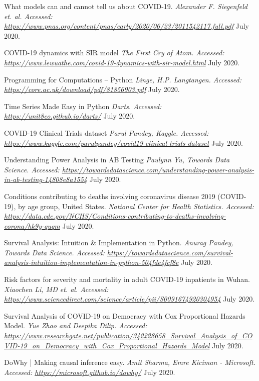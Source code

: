 \begin{thebibliography}{1}
 What models can and cannot tell us about COVID-19. {\em Alexander F. Siegenfeld et. al. Accessed:  \url{https://www.pnas.org/content/pnas/early/2020/06/23/2011542117.full.pdf}} July 2020.

 COVID-19 dynamics with SIR model {\em The First Cry of Atom. Accessed:  \url{https://www.lewuathe.com/covid-19-dynamics-with-sir-model.html}} July 2020.

 Programming for Computations – Python {\em Linge, H.P. Langtangen. Accessed:  \url{https://core.ac.uk/download/pdf/81856903.pdf}} July 2020.

 Time Series Made Easy in Python {\em Darts. Accessed:  \url{https://unit8co.github.io/darts/}} July 2020.

 COVID-19 Clinical Trials dataset {\em Parul Pandey, Kaggle.
Accessed:  \url{https://www.kaggle.com/parulpandey/covid19-clinical-trials-dataset}} July 2020.

 Understanding Power Analysis in AB Testing {\em Paulynn Yu, Towards Data Science.
Accessed:  \url{https://towardsdatascience.com/understanding-power-analysis-in-ab-testing-14808e8a1554}} July 2020.

 Conditions contributing to deaths involving coronavirus disease 2019 (COVID-19), by age group, United States. {\em 	National Center for Health Statistics. Accessed:  \url{https://data.cdc.gov/NCHS/Conditions-contributing-to-deaths-involving-corona/hk9y-quqm}} July 2020.

 Survival Analysis: Intuition & Implementation in Python. {\em 	Anurag Pandey, Towards Data Science. Accessed:  \url{https://towardsdatascience.com/survival-analysis-intuition-implementation-in-python-504fde4fcf8e}} July 2020.

 Risk factors for severity and mortality in adult COVID-19 inpatients in Wuhan. {\em Xiaochen Li, MD et. al. Accessed:  \url{https://www.sciencedirect.com/science/article/pii/S0091674920304954}} July 2020.

 Survival Analysis of COVID-19 on Democracy with Cox Proportional Hazards Model. {\em 	Yue Zhao and Deepika Dilip. Accessed:  \url{https://www.researchgate.net/publication/342228658_Survival_Analysis_of_COVID-19_on_Democracy_with_Cox_Proportional_Hazards_Model}} July 2020.

 DoWhy | Making causal inference easy. {\em 	Amit Sharma, Emre Kiciman - Microsoft. Accessed:  \url{https://microsoft.github.io/dowhy/}} July 2020.


\end{thebibliography}
